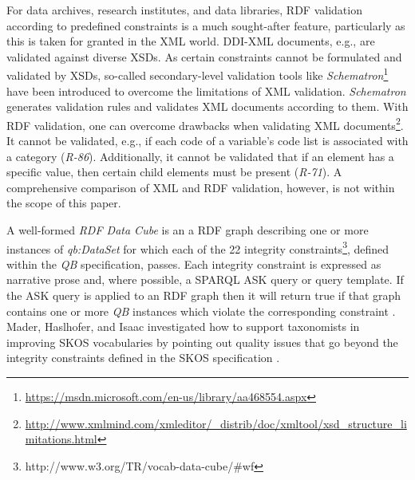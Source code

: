 \documentclass{llncs}
\begin{document}
{%
For data archives, research institutes, and data libraries,
RDF validation according to predefined constraints is a much sought-after feature, 
particularly as this is taken for granted in the XML world.
DDI-XML documents, e.g., are validated against diverse XSDs\footnotemark[\ref{fnt:DDI-XSDs}].
As certain constraints cannot be formulated and validated by XSDs, 
so-called secondary-level validation tools like \emph{Schematron}\footnote{\url{https://msdn.microsoft.com/en-us/library/aa468554.aspx}} have been introduced to overcome the limitations of XML validation.
\emph{Schematron} generates validation rules and validates XML documents according to them.
With RDF validation, one can overcome drawbacks when validating XML documents\footnote{\url{http://www.xmlmind.com/xmleditor/_distrib/doc/xmltool/xsd_structure_limitations.html}}.
It cannot be validated, e.g., if each code of a variable's code list is associated with a category (\emph{R-86}).
Additionally, it cannot be validated that if an element has a specific value, then certain child elements must be present (\emph{R-71}).  
A comprehensive comparison of XML and RDF validation, however, is not within the scope of this paper.


A well-formed \emph{RDF Data Cube} is an a RDF graph describing one or more instances of \emph{qb:DataSet} for which each of the 22 integrity constraints\footnote{http://www.w3.org/TR/vocab-data-cube/\#wf}, defined within the \emph{QB} specification, passes.
Each integrity constraint is expressed as narrative prose and, where possible, a SPARQL ASK query or query template. 
If the ASK query is applied to an RDF graph then it will return true if that graph contains one or more \emph{QB} instances which violate the corresponding constraint \cite{CyganiakReynolds2014}.
Mader, Haslhofer, and Isaac investigated how to support
taxonomists in improving SKOS vocabularies by pointing out quality
issues that go beyond the integrity constraints defined in the SKOS specification \cite{MaderHaslhoferIsaac2012}.

}
\end{document}
